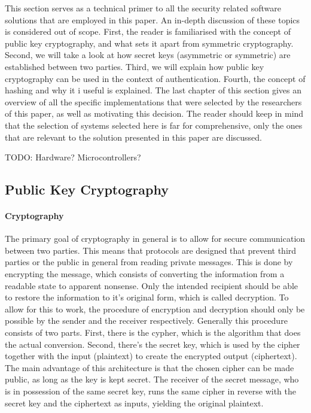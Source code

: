 \documentclass[11pt]{article}
\begin{document}
This section serves as a technical primer to all the security related software solutions that are employed in this paper. An in-depth discussion of these topics is considered out of scope. First, the reader is familiarised with the concept of public key cryptography, and what sets it apart from symmetric cryptography. Second, we will take a look at how secret keys (asymmetric or symmetric) are established between two parties. Third, we will explain how public key cryptography can be used in the context of authentication. Fourth, the concept of hashing and why it i useful is explained. The last chapter of this section gives an overview of all the specific implementations that were selected by the researchers of this paper, as well as motivating this decision. The reader should keep in mind that the selection of systems selected here is far for comprehensive, only the ones that are relevant to the solution presented in this paper are discussed. 

TODO: Hardware? Microcontrollers?

\subsection{Public Key Cryptography}

\paragraph{Cryptography} The primary goal of cryptography in general is to allow for secure communication between two parties. This means that protocols are designed that prevent third parties or the public in general from reading private messages. This is done by encrypting the message, which consists of converting the information from a readable state to apparent nonsense. Only the intended recipient should be able to restore the information to it's original form, which is called decryption. To allow for this to work, the procedure of encryption and decryption should only be possible by the sender and the receiver respectively. Generally this procedure consists of two parts. First, there is the cypher, which is the algorithm that does the actual conversion. Second, there's the secret key, which is used by the cipher together with the input (plaintext) to create the encrypted output (ciphertext). The main advantage of this architecture is that the chosen cipher can be made public, as long as the key is kept secret. The receiver of the secret message, who is in possession of the same secret key, runs the same cipher in reverse with the secret key and the ciphertext as inputs, yielding the original plaintext.\cite{Cryptowiki}
\end{document}

